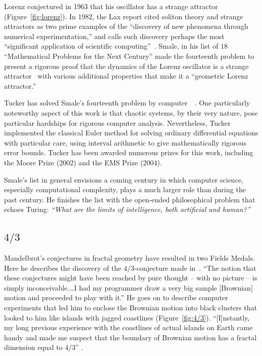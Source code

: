 \documentclass{llncs}
\begin{document}
Lorenz conjectured in 1963 that his oscillator has a strange attractor
(Figure~\ref{fig:lorenz}).  In 1982, the Lax report cited soliton
theory and strange attractors as two prime examples of the ``discovery
of new phenomena through numerical experimentation,'' and calls such
discovery perhaps the most ``significant application of scientific
computing''~\cite{Lax}.  Smale, in his list of $18$ ``Mathematical
Problems for the Next Century'' made the fourteenth problem to present
a rigorous proof that the dynamics of the Lorenz oscillator is a
strange attractor~\cite{Sma98} with various additional properties that
make it a ``geometric Lorenz attractor.''

Tucker has solved Smale's fourteenth problem by
computer~\cite{Tuc02}~\cite{St00}.  One particularly noteworthy aspect
of this work is that chaotic systems, by their very nature, pose
particular hardships for rigorous computer analysis.  Nevertheless,
Tucker implemented the classical Euler method for solving ordinary
differential equations with particular care,  using interval
arithmetic to give mathematically rigorous error bounds.  Tucker has
been awarded numerous prizes for this work, including the Moore Prize
(2002) and the EMS Prize (2004).

Smale's list in general envisions a coming century in which computer
science, especially computational complexity, plays a much larger
role than during the past century. He finishes the list with the
open-ended philosophical problem  that echoes Turing: {\it
  ``What are the limits of intelligence, both artificial and human?''}


\subsection{$4/3$}
Mandelbrot's conjectures in fractal geometry have resulted in two
Fields Medals.  Here he describes the discovery of the
$4/3$-conjecture made in~\cite{ManFN}.  ``The notion that these
conjectures might have been reached by pure thought -- with no picture
-- is simply inconceivable.\dots I had my programmer draw a very big
sample [Brownian] motion and proceeded to play with it.''  He goes on
to describe computer experiments that led him to enclose the Brownian
motion into black clusters that looked to him like islands with jagged
coastlines (Figure~\ref{fig:4/3}).
``[I]nstantly, my long previous experience with the coastlines of
  actual islands on Earth came handy and made me suspect that the
  boundary of Brownian motion has a fractal dimension equal to $4/3$''
\cite{Man}.
\end{document}
